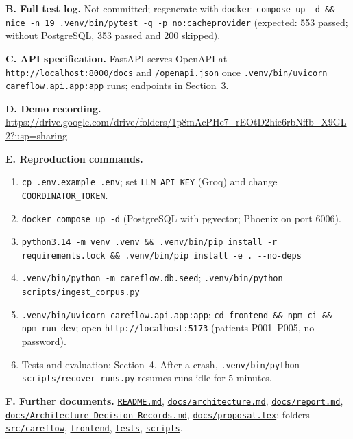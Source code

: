 \documentclass[10pt,a4paper]{article}
\newcommand{\repourl}{https://github.com/saideepaksana/careflow}
\newcommand{\rev}{cs5903-final-2026}
\newcommand{\file}[1]{\href{\repourl/blob/\rev/#1}{\nolinkurl{#1}}}
\newcommand{\dir}[1]{\href{\repourl/tree/\rev/#1}{\nolinkurl{#1}}}
\newcommand{\cmd}[1]{\nolinkurl{#1}}
\begin{document}
\textbf{B. Full test log.} Not committed; regenerate with \cmd{docker compose up -d && nice -n 19 .venv/bin/pytest -q -p no:cacheprovider} (expected: 553 passed; without PostgreSQL, 353 passed and 200 skipped).

\textbf{C. API specification.} FastAPI serves OpenAPI at \texttt{http://localhost:8000/docs} and \texttt{/openapi.json} once \cmd{.venv/bin/uvicorn careflow.api.app:app} runs; endpoints in Section~3.

\textbf{D. Demo recording.} \url{https://drive.google.com/drive/folders/1p8mAcPHe7_rEOtD2hie6rbNffb_X9GL2?usp=sharing}

\textbf{E. Reproduction commands.}
\begin{enumerate}
    \item \cmd{cp .env.example .env}; set \texttt{LLM\_API\_KEY} (Groq) and change \texttt{COORDINATOR\_TOKEN}.
    \item \cmd{docker compose up -d} (PostgreSQL with pgvector; Phoenix on port 6006).
    \item \cmd{python3.14 -m venv .venv && .venv/bin/pip install -r requirements.lock && .venv/bin/pip install -e . --no-deps}
    \item \cmd{.venv/bin/python -m careflow.db.seed}; \cmd{.venv/bin/python scripts/ingest_corpus.py}
    \item \cmd{.venv/bin/uvicorn careflow.api.app:app}; \cmd{cd frontend && npm ci && npm run dev}; open \texttt{http://localhost:5173} (patients P001--P005, no password).
    \item Tests and evaluation: Section~4. After a crash, \cmd{.venv/bin/python scripts/recover_runs.py} resumes runs idle for 5 minutes.
\end{enumerate}

\textbf{F. Further documents.} \file{README.md}, \file{docs/architecture.md}, \file{docs/report.md}, \file{docs/Architecture_Decision_Records.md}, \file{docs/proposal.tex}; folders \dir{src/careflow}, \dir{frontend}, \dir{tests}, \dir{scripts}.
\end{document}
